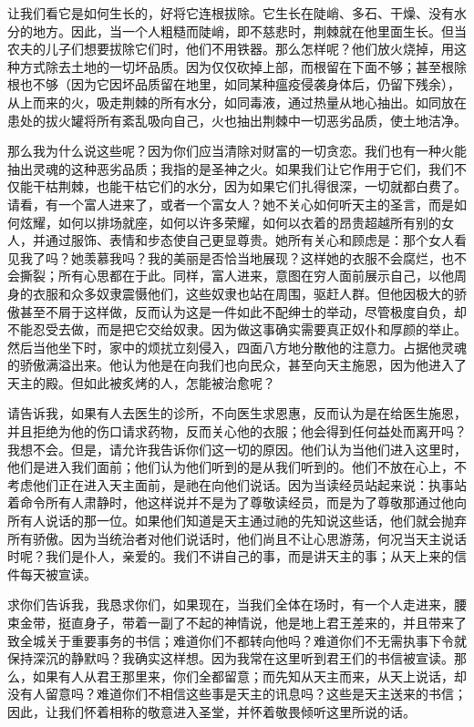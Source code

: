 让我们看它是如何生长的，好将它连根拔除。它生长在陡峭、多石、干燥、没有水分的地方。因此，当一个人粗糙而陡峭，即不慈悲时，荆棘就在他里面生长。但当农夫的儿子们想要拔除它们时，他们不用铁器。那么怎样呢？他们放火烧掉，用这种方式除去土地的一切坏品质。因为仅仅砍掉上部，而根留在下面不够；甚至根除根也不够（因为它因坏品质留在地里，如同某种瘟疫侵袭身体后，仍留下残余），从上而来的火，吸走荆棘的所有水分，如同毒液，通过热量从地心抽出。如同放在患处的拔火罐将所有紊乱吸向自己，火也抽出荆棘中一切恶劣品质，使土地洁净。\par

那么我为什么说这些呢？因为你们应当清除对财富的一切贪恋。我们也有一种火能抽出灵魂的这种恶劣品质；我指的是圣神之火。如果我们让它作用于它们，我们不仅能干枯荆棘，也能干枯它们的水分，因为如果它们扎得很深，一切就都白费了。请看，有一个富人进来了，或者一个富女人？她不关心如何听天主的圣言，而是如何炫耀，如何以排场就座，如何以许多荣耀，如何以衣着的昂贵超越所有别的女人，并通过服饰、表情和步态使自己更显尊贵。她所有关心和顾虑是：那个女人看见我了吗？她羡慕我吗？我的美丽是否恰当地展现？这样她的衣服不会腐烂，也不会撕裂；所有心思都在于此。同样，富人进来，意图在穷人面前展示自己，以他周身的衣服和众多奴隶震慑他们，这些奴隶也站在周围，驱赶人群。但他因极大的骄傲甚至不屑于这样做，反而认为这是一件如此不配绅士的举动，尽管极度自负，却不能忍受去做，而是把它交给奴隶。因为做这事确实需要真正奴仆和厚颜的举止。然后当他坐下时，家中的烦扰立刻侵入，四面八方地分散他的注意力。占据他灵魂的骄傲满溢出来。他认为他是在向我们也向民众，甚至向天主施恩，因为他进入了天主的殿。但如此被炙烤的人，怎能被治愈呢？\par

请告诉我，如果有人去医生的诊所，不向医生求恩惠，反而认为是在给医生施恩，并且拒绝为他的伤口请求药物，反而关心他的衣服；他会得到任何益处而离开吗？我想不会。但是，请允许我告诉你们这一切的原因。他们认为当他们进入这里时，他们是进入我们面前；他们认为他们听到的是从我们听到的。他们不放在心上，不考虑他们正在进入天主面前，是祂在向他们说话。因为当读经员站起来说：执事站着命令所有人肃静时，他这样说并不是为了尊敬读经员，而是为了尊敬那通过他向所有人说话的那一位。如果他们知道是天主通过祂的先知说这些话，他们就会抛弃所有骄傲。因为当统治者对他们说话时，他们尚且不让心思游荡，何况当天主说话时呢？我们是仆人，亲爱的。我们不讲自己的事，而是讲天主的事；从天上来的信件每天被宣读。\par

求你们告诉我，我恳求你们，如果现在，当我们全体在场时，有一个人走进来，腰束金带，挺直身子，带着一副了不起的神情说，他是地上君王差来的，并且带来了致全城关于重要事务的书信；难道你们不都转向他吗？难道你们不无需执事下令就保持深沉的静默吗？我确实这样想。因为我常在这里听到君王们的书信被宣读。那么，如果有人从君王那里来，你们全都留意；而先知从天主而来，从天上说话，却没有人留意吗？难道你们不相信这些事是天主的讯息吗？这些是天主送来的书信；因此，让我们怀着相称的敬意进入圣堂，并怀着敬畏倾听这里所说的话。\par

